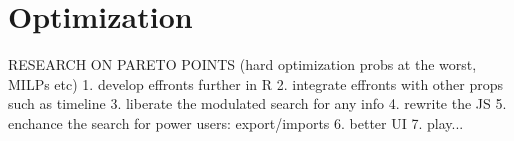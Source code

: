 
\section{Optimization}

RESEARCH ON PARETO POINTS 
(hard optimization probs at the worst, MILPs etc)
1. develop effronts further in R
2. integrate effronts with other props such as timeline
3. liberate the modulated search for any info
4. rewrite the JS
5. enchance the search for power users: export/imports
6. better UI
7. play...


